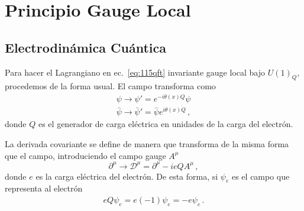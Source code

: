 \chapter{Principio Gauge Local}
\label{cha:princ-gauge-local} %


\section{Electrodinámica Cuántica}
\label{sec:electr-cuant}

Para hacer el Lagrangiano en ec.~\eqref{eq:115qft} invariante gauge local bajo $U(1)_Q$, procedemos de la forma usual. El campo transforma como
\begin{align}
  \psi\to\psi'=e^{-i\theta(x)Q}\psi\nonumber\\
  \bar{\psi}\to\bar{\psi}'=\bar{\psi}e^{i\theta(x)Q}\,,
\end{align}
donde $Q$ es el generador de carga eléctrica en unidades de la carga del electrón.

La derivada covariante se define de manera que transforma de la misma forma que el campo, introduciendo el campo gauge $A^\mu$
\begin{equation}
  \label{eq:202qft}
  \partial^\mu\to\mathcal{D}^\mu=\partial^\mu-ieQA^\mu\,,
\end{equation}
donde $e$ es la carga eléctrica del electrón. De esta forma, si $\psi_e$ es el campo que representa al electrón
\begin{align}
  eQ \psi_e=e(-1)\psi_e=-e \psi_e\,.
\end{align}

